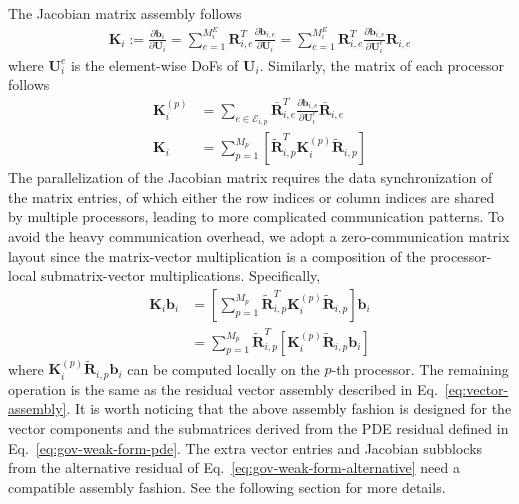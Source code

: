\documentclass[preprint,12pt,sort&compress]{elsarticle}
\theoremstyle{definition}%
\begin{document}
The Jacobian matrix assembly follows
\begin{align}
  \bm{K}_i
  :=\frac{\partial\bm{b}_i}{\partial \bm{U}_{i}} 
  =\sum_{e=1}^{M^E_i}\bm{R}^T_{i,e}\frac{\partial\bm{b}_{i,e}}{\partial \bm{U}_{i}}
  =\sum_{e=1}^{M^E_i}\bm{R}^T_{i,e}\frac{\partial\bm{b}_{i,e}}{\partial \bm{U}_{i}^e}\bm{R}_{i,e}
\end{align}
where $\bm{U}_{i}^e$ is the element-wise DoFs of $\bm{U}_{i}$. Similarly, the matrix of each processor follows
\begin{align}
  \bm{K}^{(p)}_i &= \sum_{e\in\mathcal{E}_{i,p}}\overline{\bm{R}}^T_{i,e}\frac{\partial\bm{b}_{i,e}}{\partial \bm{U}_{i}^e}\overline{\bm{R}}_{i,e}\\
  \bm{K}_i &= \sum_{p=1}^{M_p}\left[\tilde{\bm{R}}^T_{i,p}\bm{K}^{(p)}_i \tilde{\bm{R}}_{i,p}\right]
\end{align}
The parallelization of the Jacobian matrix requires the data synchronization of the matrix entries, of which either the row indices or column indices are shared by multiple processors, leading to more complicated communication patterns. 
To avoid the heavy communication overhead, we adopt a zero-communication matrix layout since the matrix-vector multiplication is a composition of the processor-local submatrix-vector multiplications.
Specifically,
\begin{align}
  \nonumber \bm{K}_i \bm{b}_i &= \left[\sum_{p=1}^{M_p} \tilde{\bm{R}}^{T}_{i,p}\bm{K}^{(p)}_i \tilde{\bm{R}}_{i,p}\right]\bm{b}_i \\
                              &= \sum_{p=1}^{M_p}\tilde{\bm{R}}^{T}_{i,p} \left[\bm{K}^{(p)}_i \tilde{\bm{R}}_{i,p}\bm{b}_i\right]
\end{align}
where $\bm{K}^{(p)}_i \tilde{\bm{R}}_{i,p}\bm{b}_i$ can be computed locally on the $p$-th processor. 
The remaining operation is the same as the residual vector assembly described in Eq.~\ref{eq:vector-assembly}.
It is worth noticing that the above assembly fashion is designed for the vector components and the submatrices derived from the PDE residual defined in Eq.~\ref{eq:gov-weak-form-pde}. 
The extra vector entries and Jacobian subblocks from the alternative residual of Eq.~\ref{eq:gov-weak-form-alternative} need a compatible assembly fashion. See the following section for more details.
\end{document}
